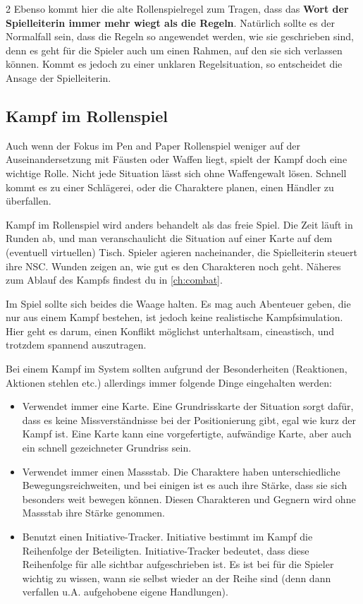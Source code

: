 \begin{multicols}{2}
Ebenso kommt hier die alte Rollenspielregel zum Tragen, dass das \textbf{Wort der Spielleiterin immer mehr wiegt als die Regeln}. Natürlich sollte es der Normalfall sein, dass die Regeln so angewendet werden, wie sie geschrieben sind, denn es geht für die Spieler auch um einen Rahmen, auf den sie sich verlassen können. Kommt es jedoch zu einer unklaren Regelsituation, so entscheidet die Ansage der Spielleiterin.

\subsection{Kampf im Rollenspiel}

Auch wenn der Fokus im Pen and Paper Rollenspiel weniger auf der Auseinandersetzung mit Fäusten oder Waffen liegt, spielt der Kampf doch eine wichtige Rolle. Nicht jede Situation lässt sich ohne Waffengewalt lösen. Schnell kommt es zu einer Schlägerei, oder die Charaktere planen, einen Händler zu überfallen.

Kampf im Rollenspiel wird anders behandelt als das freie Spiel. Die Zeit läuft in Runden ab, und man veranschaulicht die Situation auf einer Karte auf dem (eventuell virtuellen) Tisch. Spieler agieren nacheinander, die Spielleiterin steuert ihre NSC. Wunden zeigen an, wie gut es den Charakteren noch geht. Näheres zum Ablauf des Kampfs findest du in \cref{ch:combat}.

Im Spiel sollte sich beides die Waage halten. Es mag auch Abenteuer geben, die nur aus einem Kampf bestehen,  ist jedoch keine realistische Kampfsimulation. Hier geht es darum, einen Konflikt möglichst unterhaltsam, cineastisch, und trotzdem spannend auszutragen.

Bei einem Kampf im \textit{} System sollten aufgrund der Besonderheiten (Reaktionen, Aktionen stehlen etc.) allerdings immer folgende Dinge eingehalten werden:

\begin{itemize}
    \item Verwendet immer eine Karte. Eine Grundrisskarte der Situation sorgt dafür, dass es keine Missverständnisse bei der Positionierung gibt, egal wie kurz der Kampf ist. Eine Karte kann eine vorgefertigte, aufwändige Karte, aber auch ein schnell gezeichneter Grundriss sein.
    \item Verwendet immer einen Massstab. Die Charaktere haben unterschiedliche Bewegungsreichweiten, und bei einigen ist es auch ihre Stärke, dass sie sich besonders weit bewegen können. Diesen Charakteren und Gegnern wird ohne Massstab ihre Stärke genommen.
    \item Benutzt einen Initiative-Tracker. Initiative bestimmt im Kampf die Reihenfolge der Beteiligten. Initiative-Tracker bedeutet, dass diese Reihenfolge für alle sichtbar aufgeschrieben ist. Es ist bei  für die Spieler wichtig zu wissen, wann sie selbst wieder an der Reihe sind (denn dann verfallen u.A. aufgehobene eigene Handlungen).
\end{itemize}


\end{multicols}
